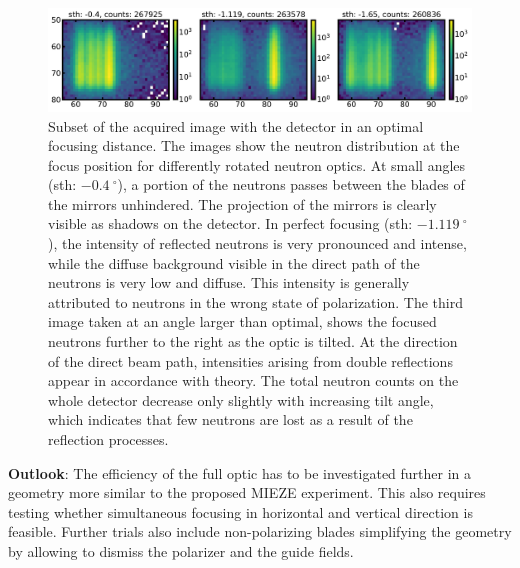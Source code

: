 \documentclass[12pt]{article}
\begin{document}
\begin{figure}[]
	\centering
	\includegraphics[width=1\textwidth]{./figures_report/focus}
	\caption{Subset of the acquired image with the detector in an optimal focusing distance. The images show the neutron distribution at the focus position for differently rotated neutron optics. At small angles (sth: $\SI{-0.4}{^\circ}$), a portion of the neutrons passes between the blades of the mirrors unhindered. The projection of the mirrors is clearly visible as shadows on the detector. In perfect focusing (sth: $\SI{-1.119}{^\circ}$), the intensity of reflected neutrons is very pronounced and intense, while the diffuse background visible in the direct path of the neutrons is very low and diffuse. This intensity is generally attributed to neutrons in the wrong state of polarization. The third image taken at an angle larger than optimal, shows the focused neutrons further to the right as the optic is tilted. At the direction of the direct beam path, intensities arising from double reflections appear in accordance with theory. The total neutron counts on the whole detector decrease only slightly with increasing tilt angle, which indicates that few neutrons are lost as a result of the reflection processes.}
	\label{fig:allthree}
\end{figure}

\noindent\textbf{Outlook}:
The efficiency of the full optic has to be investigated further in a geometry more similar to the proposed MIEZE experiment. This also requires testing whether simultaneous focusing in horizontal and vertical direction is feasible. Further trials also include non-polarizing blades simplifying the geometry by allowing to dismiss the polarizer and the guide fields.



\end{document}
